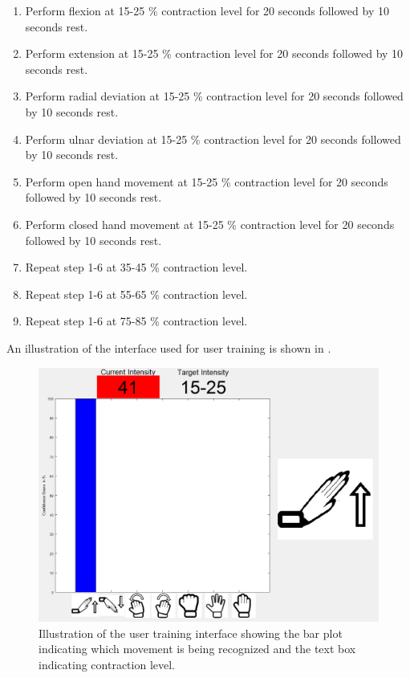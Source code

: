 \begin{enumerate}
	\item Perform flexion at 15-25 \% contraction level for 20 seconds followed by 10 seconds rest.
	\item Perform extension at 15-25 \% contraction level for 20 seconds followed by 10 seconds rest.
	\item Perform radial deviation at 15-25 \% contraction level for 20 seconds followed by 10 seconds rest.
	\item Perform ulnar deviation at 15-25 \% contraction level for 20 seconds followed by 10 seconds rest.
	\item Perform open hand movement at 15-25 \% contraction level for 20 seconds followed by 10 seconds rest.
	\item Perform closed hand movement at 15-25 \% contraction level for 20 seconds followed by 10 seconds rest.
	\item Repeat step 1-6 at 35-45 \% contraction level.
	\item Repeat step 1-6 at 55-65 \% contraction level.
	\item Repeat step 1-6 at 75-85 \% contraction level.
\end{enumerate} 

An illustration of the interface used for user training is shown in .

\begin{figure}[H]                 
	\includegraphics[width=.6\textwidth]{figures/xBackground/usertraincontrolGUI}  
	\caption{Illustration of the user training interface showing the bar plot indicating which movement is being recognized and the text box indicating contraction level.}
	\label{fig:usertraincontrolGUI} 
\end{figure}

